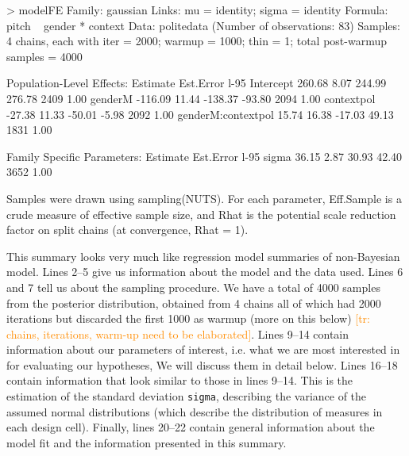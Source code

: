 \documentclass[nobib]{tufte-handout}
\newcommand{\tr}[1]{\textcolor{DarkOrange}{[tr: #1]}}
\begin{document}
\begin{minipage}[]{1.2\textwidth}
\begin{rc}
> modelFE
 Family: gaussian 
  Links: mu = identity; sigma = identity 
Formula: pitch ~ gender * context 
   Data: politedata (Number of observations: 83) 
Samples: 4 chains, each with iter = 2000; warmup = 1000; thin = 1;
         total post-warmup samples = 4000

Population-Level Effects: 
                   Estimate Est.Error l-95%
Intercept            260.68      8.07   244.99   276.78       2409 1.00
genderM             -116.09     11.44  -138.37   -93.80       2094 1.00
contextpol           -27.38     11.33   -50.01    -5.98       2092 1.00
genderM:contextpol    15.74     16.38   -17.03    49.13       1831 1.00

Family Specific Parameters: 
      Estimate Est.Error l-95%
sigma    36.15      2.87    30.93    42.40       3652 1.00

Samples were drawn using sampling(NUTS). For each parameter, Eff.Sample 
is a crude measure of effective sample size, and Rhat is the potential 
scale reduction factor on split chains (at convergence, Rhat = 1).
\end{rc}
\end{minipage}

\medskip

This summary looks very much like regression model summaries of non-Bayesian model. Lines 2--5 give us information about the model and the data used. Lines 6 and 7 tell us about the sampling procedure. We have a total of 4000 samples from the posterior distribution, obtained from 4 chains all of which had 2000 iterations but discarded the first 1000 as warmup (more on this below) \tr{chains, iterations, warm-up need to be elaborated}. Lines 9--14 contain information about our parameters of interest, i.e. what we are most interested in for evaluating our hypotheses, We will discuss them in detail below. Lines 16--18 contain information that look similar to those in lines 9--14. This is the estimation of the standard deviation \texttt{sigma}, describing the variance of the assumed normal distributions (which describe the distribution of measures in each design cell). Finally, lines 20--22 contain general information about the model fit and the information presented in this summary.
\end{document}
